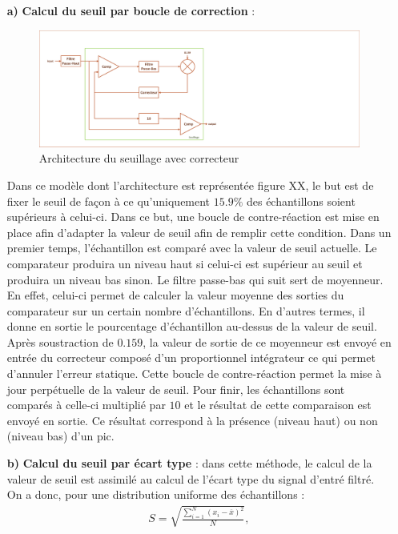 \documentclass[a4paper,12pt]{article}
\begin{document}
\begin{itemize}
\begin{itemize}
\item[\textbf{a)}] \textbf{Calcul du seuil par boucle de correction} :
\begin{figure}[H]
\centering
\includegraphics[width=\textwidth, keepaspectratio]{chainCedric.pdf}
\caption{Architecture du seuillage avec correcteur}
\end{figure}
Dans ce modèle dont l'architecture est représentée figure XX, le but est de fixer le seuil de façon à ce qu'uniquement $15.9 \%$ des échantillons soient supérieurs à celui-ci. Dans ce but, une boucle de contre-réaction est mise en place afin d'adapter la valeur de seuil afin de remplir cette condition. Dans un premier temps, l'échantillon est comparé avec la valeur de seuil actuelle. Le comparateur produira un niveau haut si celui-ci est supérieur au seuil et produira un niveau bas sinon. Le filtre passe-bas qui suit sert de moyenneur. En effet, celui-ci permet de calculer la valeur moyenne des sorties du comparateur sur un certain nombre d'échantillons. En d'autres termes, il donne en sortie le pourcentage d'échantillon au-dessus de la valeur de seuil. Après soustraction de $0.159$, la valeur de sortie de ce moyenneur est envoyé en entrée du correcteur composé d'un proportionnel intégrateur ce qui permet d'annuler l'erreur statique. Cette boucle de contre-réaction permet la mise à jour perpétuelle de la valeur de seuil. Pour finir, les échantillons sont comparés à celle-ci multiplié par $10$ et le résultat de cette comparaison est envoyé en sortie. Ce résultat correspond à la présence (niveau haut) ou non (niveau bas) d'un pic.
\item[\textbf{b)}] \textbf{Calcul du seuil par écart type} : dans cette méthode, le calcul de la valeur de seuil est assimilé au calcul de l'écart type du signal d'entré filtré. On a donc, pour une distribution uniforme des échantillons :
\begin{eqnarray*}
S = \sqrt{\frac{\sum^N_{i=1}\left(x_i-\overline{x}\right)^2}{N}},
\end{eqnarray*}

\end{itemize}
\end{itemize}
\end{document}
